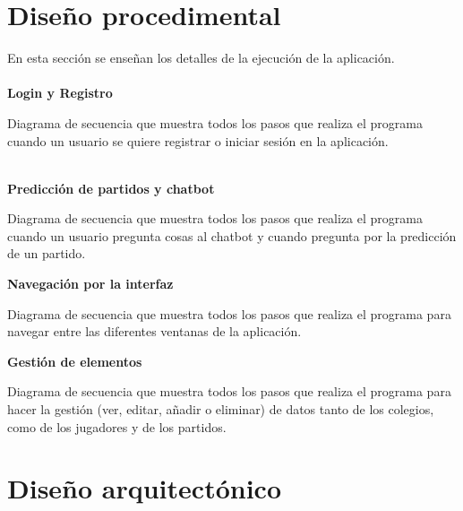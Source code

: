 
\newpage

\section{Diseño procedimental}

En esta sección se enseñan los detalles de la ejecución de la aplicación.
\\
\\

\textbf{Login y Registro}

Diagrama de secuencia que muestra todos los pasos que realiza el programa cuando un usuario se quiere registrar o iniciar sesión en la aplicación.
\\
\\


\newpage

\textbf{Predicción de partidos y chatbot}

Diagrama de secuencia que muestra todos los pasos que realiza el programa cuando un usuario pregunta cosas al chatbot y cuando pregunta por la predicción de un partido.


\newpage

\textbf{Navegación por la interfaz}

Diagrama de secuencia que muestra todos los pasos que realiza el programa para navegar entre las diferentes ventanas de la aplicación.


\newpage

\textbf{Gestión de elementos}

Diagrama de secuencia que muestra todos los pasos que realiza el programa para hacer la gestión (ver, editar, añadir o eliminar) de datos tanto de los colegios, como de los jugadores y de los partidos.


\newpage

\section{Diseño arquitectónico}

